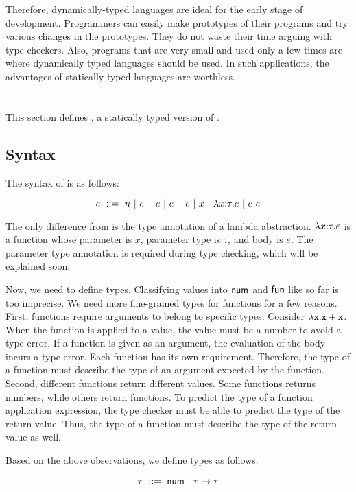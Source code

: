 Therefore, dynamically-typed languages are ideal for the early stage of
development. Programmers can easily make prototypes of their programs and try
various changes in the prototypes. They do not waste their time arguing with type
checkers. Also, programs that are very small and used only a few times are where
dynamically typed languages should be used. In such applications, the advantages
of statically typed languages are worthless.

\section{\lang}

This section defines \lang, a statically typed version of \plang.

\subsection{Syntax}

The syntax of \lang is as follows:

\[
e\ ::=\ n
\ |\ e + e
\ |\ e - e
\ |\ x
\ |\ \lambda x{:}\tau.e
\ |\ e\ e
\]

The only difference from \plang is the type annotation of a lambda abstraction.
$\lambda x{:}\tau.e$ is a function whose parameter is $x$, parameter type is
$\tau$, and body is $e$. The parameter type annotation is required during
type checking, which will be explained soon.

Now, we need to define types. Classifying values into $\textsf{num}$ and $\textsf{fun}$ like so
far is too imprecise. We need more fine-grained types for functions for a few
reasons. First, functions require arguments to belong to specific types.
Consider $\lambda\texttt{x}.\texttt{x}+\texttt{x}$. When the function is applied to a value, the
value must be a number to avoid a type error. If a function is given as an
argument, the evaluation of the body incurs a type error. Each function has its
own requirement. Therefore, the type of a function must describe the type of an
argument expected by the function. Second, different functions return different
values. Some functions returns numbers, while others return functions. To
predict the type of a function application expression, the type checker must be
able to predict the type of the return value. Thus, the type of a function must
describe the type of the return value as well.

Based on the above observations, we define types as follows:

\[
\tau\ ::=\ \tnum\ |\ \tarrow{\tau}{\tau}
\]

